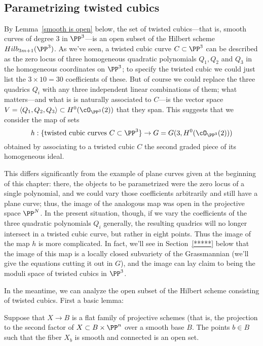 \

\subsection{Parametrizing twisted cubics} By Lemma~\ref{smooth is open} below, the set of twisted cubics---that is, smooth curves of degree 3 in $\PP^3$---is an open subset of the Hilbert scheme $Hilb_{3m+1}(\PP^3)$. As we've seen, a twisted cubic curve $C \subset \PP^3$ can be described as the zero locus of three homogeneous quadratic polynomials $Q_1, Q_2$ and $Q_3$ in the homogeneous coordinates on $\PP^3$; to specify the twisted cubic we could just list the $3 \times 10 = 30$ coefficients of these. But of course we could replace the three quadrics $Q_i$ with any three independent linear combinations of them; what matters---and what is is naturally associated to $C$---is the vector space $V = \langle Q_1, Q_2, Q_3 \rangle \subset H^0(\cO_{\PP^3}(2))$ that they span. This suggests that we consider the map of sets
$$
h : \{ \text{twisted cubic curves } C \subset \PP^3 \} \to G = G(3, H^0(\cO_{\PP^3}(2)))
$$
obtained by associating to a twisted cubic $C$ the second graded piece of its homogeneous ideal. 

This differs significantly from the example of plane curves given at the beginning of this chapter: there, the objects to be parametrized were the zero locus of a single polynomial, and we could vary those coefficients arbitrarily and still have a plane curve; thus, the image of the analogous map was open in the projective space $\PP^N$. In the present situation, though, if we vary the coefficients of the three quadratic polynomials $Q_i$ generally, the resulting quadrics will no longer intersect in a twisted cubic curve, but rather in eight points. Thus the image of the map $h$ is more complicated.
In fact, we'll see in Section~\ref{*****} below that the image of this map is a locally closed subvariety of the Grassmannian (we'll give the equations cutting it out in $G$), and the image can lay claim to being the moduli space of twisted cubics in $\PP^3$.

In the meantime, we can analyze the open subset of the Hilbert scheme consisting of twisted cubics. First a basic lemma:

\begin{lemma}\label{smooth is open}
Suppose that $X \to B$ is a flat family of projective schemes (that is, the projection to the second factor of 
$X\subset B\times \PP^n$ over a smooth base $B$. The points $b\in B$ such that the fiber $X_b$ is smooth and connected is an open set.
\end{lemma}

